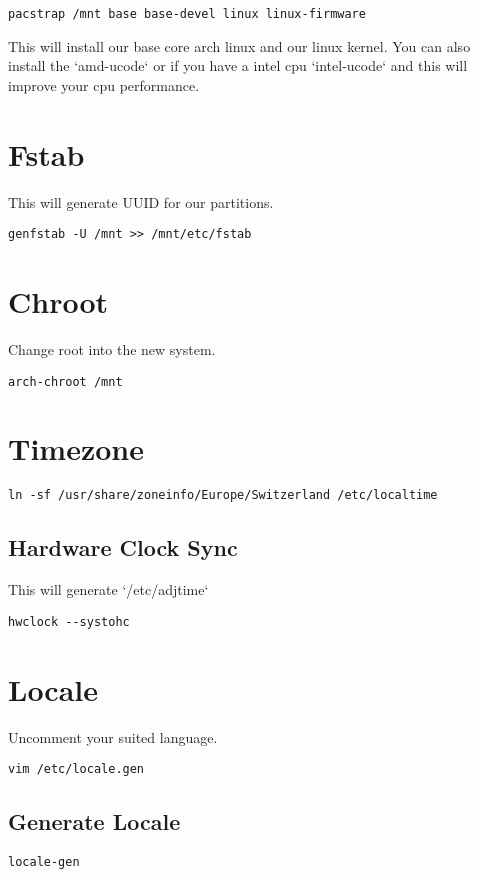 \documentclass[12pt]{article}
\begin{document}
\begin{verbatim}
pacstrap /mnt base base-devel linux linux-firmware
\end{verbatim}
This will install our base core arch linux and our linux kernel.
You can also install the `amd-ucode` or if you have a intel cpu `intel-ucode` and this will improve your cpu performance.

\section{Fstab}
This will generate UUID for our partitions.
\begin{verbatim}
genfstab -U /mnt >> /mnt/etc/fstab
\end{verbatim}

\section{Chroot}
Change root into the new system.
\begin{verbatim}
arch-chroot /mnt
\end{verbatim}

\section{Timezone}

\begin{verbatim}
ln -sf /usr/share/zoneinfo/Europe/Switzerland /etc/localtime
\end{verbatim}

\subsection{Hardware Clock Sync}
This will generate `/etc/adjtime`
\begin{verbatim}
hwclock --systohc
\end{verbatim}

\section{Locale}
Uncomment your suited language.

\begin{verbatim}
vim /etc/locale.gen
\end{verbatim}

\subsection{Generate Locale}
\begin{verbatim}
locale-gen
\end{verbatim}
\end{document}
